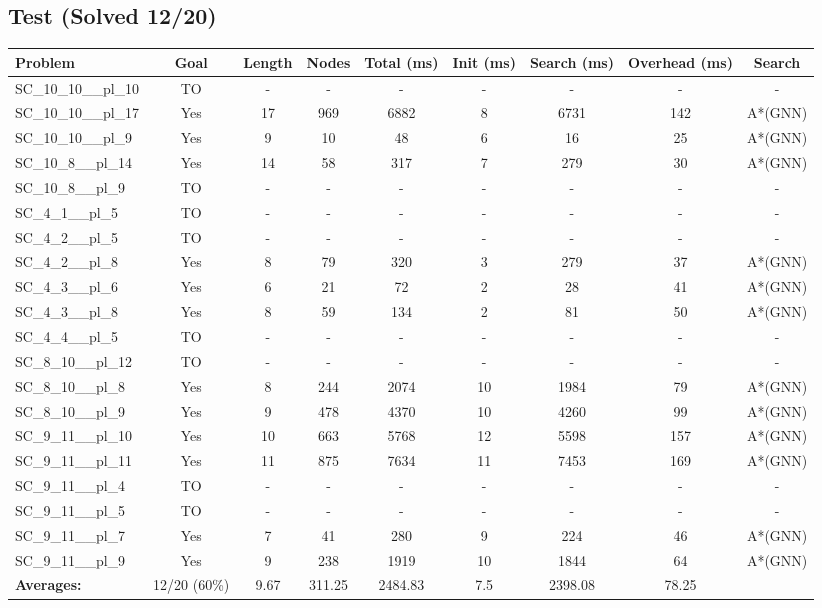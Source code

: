 \documentclass{article}
\begin{document}
\subsection*{Test (Solved 12/20)}
\begin{tabular}{lcccccccc}
\toprule
Problem & Goal & Length & Nodes & Total (ms) & Init (ms) & Search (ms) & Overhead (ms) & Search \\
\midrule
SC\_10\_10\_\_pl\_10 & TO & - & - & - & - & - & - & - \\
SC\_10\_10\_\_pl\_17 & Yes & 17 & 969 & 6882 & 8 & 6731 & 142 & A*(GNN) \\
SC\_10\_10\_\_pl\_9 & Yes & 9 & 10 & 48 & 6 & 16 & 25 & A*(GNN) \\
SC\_10\_8\_\_pl\_14 & Yes & 14 & 58 & 317 & 7 & 279 & 30 & A*(GNN) \\
SC\_10\_8\_\_pl\_9 & TO & - & - & - & - & - & - & - \\
SC\_4\_1\_\_pl\_5 & TO & - & - & - & - & - & - & - \\
SC\_4\_2\_\_pl\_5 & TO & - & - & - & - & - & - & - \\
SC\_4\_2\_\_pl\_8 & Yes & 8 & 79 & 320 & 3 & 279 & 37 & A*(GNN) \\
SC\_4\_3\_\_pl\_6 & Yes & 6 & 21 & 72 & 2 & 28 & 41 & A*(GNN) \\
SC\_4\_3\_\_pl\_8 & Yes & 8 & 59 & 134 & 2 & 81 & 50 & A*(GNN) \\
SC\_4\_4\_\_pl\_5 & TO & - & - & - & - & - & - & - \\
SC\_8\_10\_\_pl\_12 & TO & - & - & - & - & - & - & - \\
SC\_8\_10\_\_pl\_8 & Yes & 8 & 244 & 2074 & 10 & 1984 & 79 & A*(GNN) \\
SC\_8\_10\_\_pl\_9 & Yes & 9 & 478 & 4370 & 10 & 4260 & 99 & A*(GNN) \\
SC\_9\_11\_\_pl\_10 & Yes & 10 & 663 & 5768 & 12 & 5598 & 157 & A*(GNN) \\
SC\_9\_11\_\_pl\_11 & Yes & 11 & 875 & 7634 & 11 & 7453 & 169 & A*(GNN) \\
SC\_9\_11\_\_pl\_4 & TO & - & - & - & - & - & - & - \\
SC\_9\_11\_\_pl\_5 & TO & - & - & - & - & - & - & - \\
SC\_9\_11\_\_pl\_7 & Yes & 7 & 41 & 280 & 9 & 224 & 46 & A*(GNN) \\
SC\_9\_11\_\_pl\_9 & Yes & 9 & 238 & 1919 & 10 & 1844 & 64 & A*(GNN) \\
\textbf{Averages:} & 12/20 (60\%) & 9.67 & 311.25 & 2484.83 & 7.5 & 2398.08 & 78.25 & \\
\bottomrule
\end{tabular}
\\[0.7cm]
\end{document}
